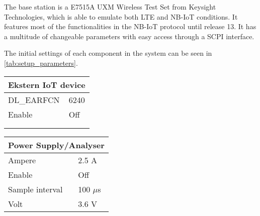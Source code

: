
The base station is a E7515A UXM Wireless Test Set from Keysight Technologies, which is able to emulate both LTE and NB-IoT conditions. It features most of the functionalities in the NB-IoT protocol until release 13. It has a multitude of changeable parameters with easy access through a SCPI interface. \citep{UXM}

The initial settings of each component in the system can be seen in \autoref{tab:setup_parameters}.

\begin{table}[H]
\captionsetup{belowskip=0em}
\noindent
\centering
\begin{minipage}[t]{0.48\textwidth}
\begin{tabular}{|p{4cm}|p{2cm}|} \hline
\multicolumn{2}{|c|}{\textbf{Ekstern IoT device}}   \\ \hline
DL\_EARFCN         & 6240           \\ \hline
Enable             & Off            \\ \hline
\multicolumn{2}{c}{}  \\ 
\multicolumn{2}{c}{}  \\ 
\end{tabular}
\end{minipage}%
\hfill
\begin{minipage}[t]{0.48\textwidth}
\raggedleft
\begin{tabular}{|p{4cm}|p{2cm}|} \hline
\multicolumn{2}{|c|}{\textbf{Power Supply/Analyser}} \\ \hline
Ampere             & 2.5 A          \\ \hline
Enable             & Off            \\ \hline
Sample interval       & 100 $\mu$s        \\ \hline
Volt               & 3.6 V          \\ \hline
\end{tabular}
\vspace{1em}
\end{minipage}
\end{table}
